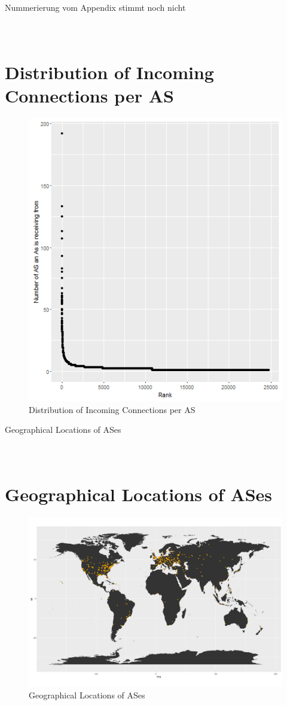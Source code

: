 \documentclass[conference]{IEEEtran}
\begin{document}
\appendix

Nummerierung vom Appendix stimmt noch nicht

\section{\\Distribution of Incoming Connections per AS}


\begin{figure}[htbp]
\centerline{\includegraphics[scale=0.4]{Graphics/AsToDistribution.png}}
\caption{Distribution of Incoming Connections per AS}
\label{fig}
\end{figure}


Geographical Locations of ASes
\section{\\Geographical Locations of ASes}
\begin{figure}[htbp]
\centerline{\includegraphics[scale=0.2]{Graphics/ASesNurPunkte.png}}
\caption{Geographical Locations of ASes}
\label{fig}
\end{figure}
\end{document}
